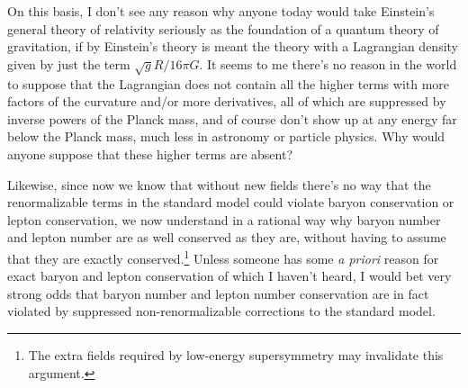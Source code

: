 \documentclass[12pt]{article}
\def\fnote#1#2{\begingroup\def\thefootnote{#1}\footnote{#2}
\endgroup}
\begin{document}
On this basis, I don't see any reason why anyone today would
take Einstein's general theory of relativity seriously as
the foundation of a quantum theory of gravitation, if by
Einstein's theory is meant the theory with a Lagrangian
density given by just the term $\sqrt{g}R/16\pi G$.  It
seems to me there's no reason in the world to suppose that
the Lagrangian does not contain all the higher terms with
more factors of the curvature and/or more derivatives, all
of which are suppressed by inverse powers of the Planck
mass, and of course don't show up at any energy far below
the Planck mass, much less in astronomy or particle physics.
Why would anyone suppose that these higher terms are absent?

Likewise,  since now we know that without new fields there's
no way that the renormalizable terms in the standard model
could violate baryon conservation or lepton conservation, we
now understand in a rational way why baryon number and
lepton number are as well conserved as they are, without
having to assume that they are exactly
conserved.\fnote{$\dagger\dagger$}{The extra fields required
by low-energy
supersymmetry may invalidate this argument.}  Unless someone
has some {\em a priori} reason for exact baryon and lepton
conservation of which I haven't heard, I would bet very
strong odds that baryon number and lepton number
conservation are in fact violated by suppressed
non-renormalizable corrections to the standard model.
\end{document}

